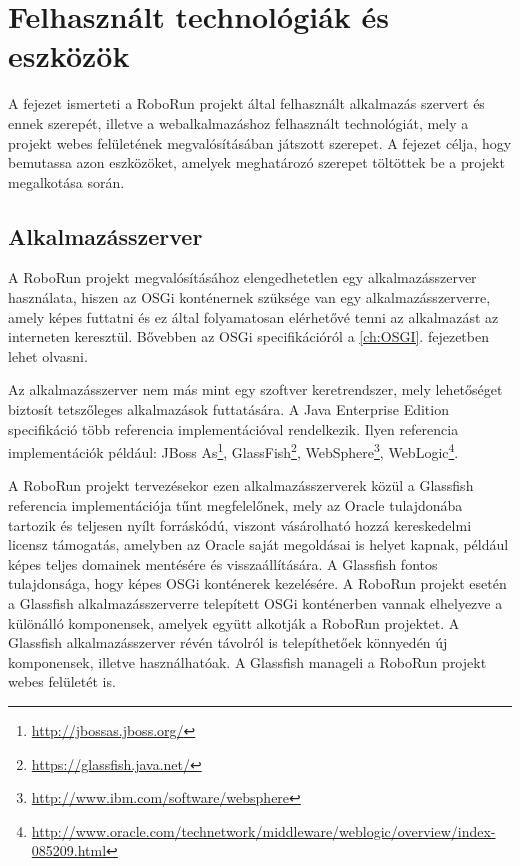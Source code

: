 \chapter{Felhasznált technológiák és eszközök}\label{ch:TechnologiakEsEszkozok}

\begin{osszefoglal}
	A fejezet ismerteti a RoboRun projekt által felhasznált alkalmazás szervert és ennek szerepét, illetve a webalkalmazáshoz felhasznált technológiát, mely a projekt webes felületének megvalósításában játszott szerepet. A fejezet célja, hogy bemutassa azon eszközöket, amelyek meghatározó szerepet töltöttek be a projekt megalkotása során.
\end{osszefoglal}


\section{Alkalmazásszerver}\label{sec:Glassfish}
	
	A RoboRun projekt megvalósításához elengedhetetlen egy alkalmazásszerver használata, hiszen az OSGi konténernek szüksége van egy alkalmazásszerverre, amely képes futtatni és ez által folyamatosan elérhetővé tenni az alkalmazást az interneten keresztül. Bővebben az OSGi specifikációról a \ref{ch:OSGI}. fejezetben lehet olvasni.
	
	 Az alkalmazásszerver nem más mint egy szoftver keretrendszer, mely lehetőséget biztosít tetszőleges alkalmazások futtatására. A Java Enterprise Edition specifikáció több referencia implementációval rendelkezik. Ilyen referencia implementációk például: JBoss As\footnote{\href {http://jbossas.jboss.org/}{http://jbossas.jboss.org/}}, GlassFish\footnote{\href {https://glassfish.java.net/}{https://glassfish.java.net/}}, WebSphere\footnote{\href {http://www.ibm.com/software/websphere}{http://www.ibm.com/software/websphere}}, WebLogic\footnote{\href {http://www.oracle.com/technetwork/middleware/weblogic/overview/index-085209.html}{http://www.oracle.com/technetwork/middleware/weblogic/overview/index-085209.html}}.
	
	A RoboRun projekt tervezésekor ezen alkalmazásszerverek közül a Glassfish referencia implementációja tűnt megfelelőnek, mely az Oracle tulajdonába tartozik és teljesen nyílt forráskódú, viszont vásárolható hozzá kereskedelmi licensz támogatás, amelyben az Oracle saját megoldásai is helyet kapnak, például képes teljes domainek mentésére és visszaállítására. A Glassfish fontos tulajdonsága, hogy képes OSGi konténerek kezelésére. A RoboRun projekt esetén a Glassfish alkalmazásszerverre telepített OSGi konténerben vannak elhelyezve a különálló komponensek, amelyek együtt alkotják a RoboRun projektet. A Glassfish alkalmazásszerver révén távolról is telepíthetőek könnyedén új komponensek, illetve használhatóak. A Glassfish manageli a RoboRun projekt webes felületét is.

